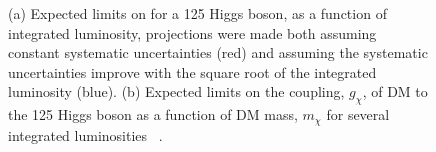 \begin{figure}

  \caption{(a) Expected limits on \BRinv for a 125 \GeV Higgs boson, as a function of integrated luminosity, projections were made both assuming constant systematic uncertainties (red) and assuming the systematic uncertainties improve with the square root of the integrated luminosity (blue). (b) Expected limits on the coupling, $g_{\chi}$, of DM to the 125 \GeV Higgs boson as a function of DM mass, $m_{\chi}$ for several integrated luminosities ~\cite{ourdmpaper}.}
  \label{fig:smprojectedlimits}
\end{figure}

